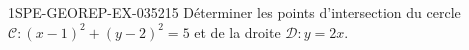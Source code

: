 \begin{exercice}{1SPE-GEOREP-EX-035}{2}{15}
Déterminer les points d'intersection du cercle $\mathcal{C} : (x-1)^2 + (y-2)^2 = 5$ et de la droite $\mathcal{D} : y = 2x$.
\end{exercice}
